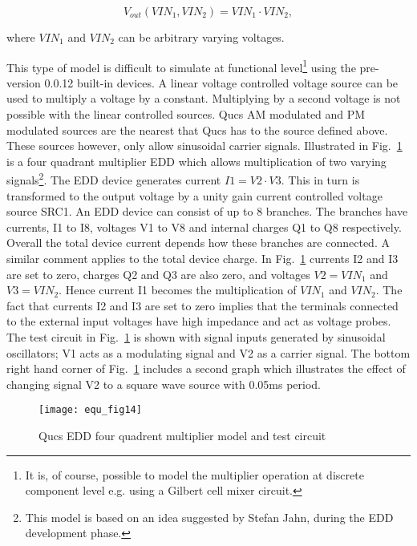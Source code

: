 \begin{equation}
V_{out}\left(VIN_1,VIN_2\right) = VIN_1\cdot VIN_2,
\end{equation}

where $VIN_1$ and $VIN_2$ can be arbitrary varying voltages.

\vspace{3mm}

This type of model is difficult to simulate at functional
level\footnote{It is, of course, possible to model the multiplier
operation at discrete component level e.g. using a Gilbert cell mixer
circuit.} using the pre-version 0.0.12 built-in devices.  A linear
voltage controlled voltage source can be used to multiply a voltage by
a constant.  Multiplying by a second voltage is not possible with the
linear controlled sources. Qucs AM modulated and PM modulated sources
are the nearest that Qucs has to the source defined above. These
sources however, only allow sinusoidal carrier signals.  Illustrated
in Fig.~\ref{fig:equ_14} is a four quadrant multiplier EDD which
allows multiplication of two varying signals\footnote{This model is
based on an idea suggested by Stefan Jahn, during the EDD development
phase.}. The EDD device generates current $I1 = V2\cdot V3$. This in
turn is transformed to the output voltage by a unity gain current
controlled voltage source SRC1. An EDD device can consist of up to 8
branches. The branches have currents, I1 to I8, voltages V1 to V8 and
internal charges Q1 to Q8 respectively. Overall the total device
current depends how these branches are connected. A similar comment
applies to the total device charge. In Fig.~\ref{fig:equ_14} currents
I2 and I3 are set to zero, charges Q2 and Q3 are also zero, and
voltages $V2=VIN_1$ and $V3=VIN_2$. Hence current I1 becomes the
multiplication of $VIN_1$ and $VIN_2$. The fact that currents I2 and
I3 are set to zero implies that the terminals connected to the
external input voltages have high impedance and act as voltage
probes. The test circuit in Fig.~\ref{fig:equ_14} is shown with signal
inputs generated by sinusoidal oscillators; V1 acts as a modulating
signal and V2 as a carrier signal. The bottom right hand corner of
Fig.~\ref{fig:equ_14} includes a second graph which illustrates the
effect of changing signal V2 to a square wave source with 0.05ms
period.


\begin{figure}[h]
  \centering
  \texttt{[image: equ\_fig14]}
  \caption{Qucs EDD four quadrent multiplier model and test circuit}
  \label{fig:equ_14}
\end{figure} 

